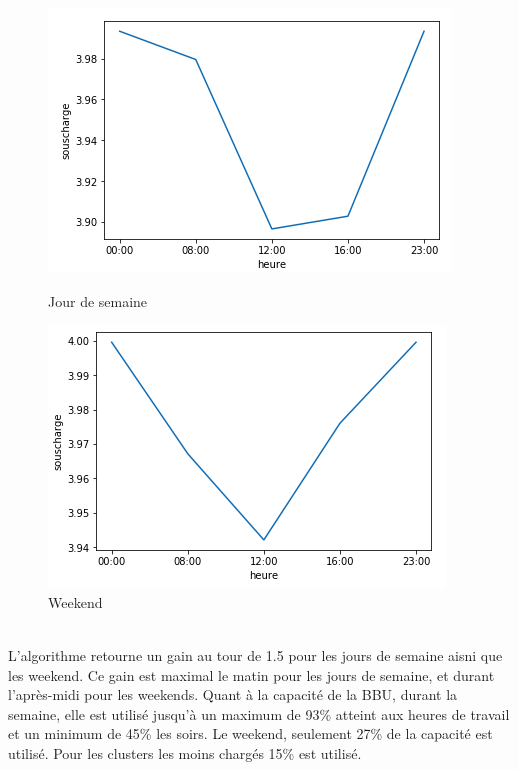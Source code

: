 \documentclass{report}
\begin{document}
\begin{figure}[H]
  \begin{minipage}{0.4\textwidth}
    \centering
    \includegraphics[scale=0.55]{images/souscharge_semaine.png}
    \caption{Jour de semaine}\label{Fig:Data1}
  \end{minipage}\hfill
  \begin{minipage}{0.4\textwidth}
    \centering
    \includegraphics[scale=0.55]{images/souscharge_wd.png}
    \caption{Weekend}\label{Fig:Data2}
  \end{minipage}
\end{figure} \\

L'algorithme retourne un gain au tour de 1.5 pour les jours de semaine aisni que les weekend. Ce gain est maximal le matin
pour les jours de semaine, et durant l'après-midi pour les weekends. Quant à la capacité de la BBU, durant la semaine, elle est utilisé jusqu'à un maximum de 93\% 
atteint aux heures de travail et un minimum de 45\% les soirs. Le weekend, seulement 27\% de la capacité est utilisé. Pour les clusters 
les moins chargés  15\% est utilisé.
\end{document}
